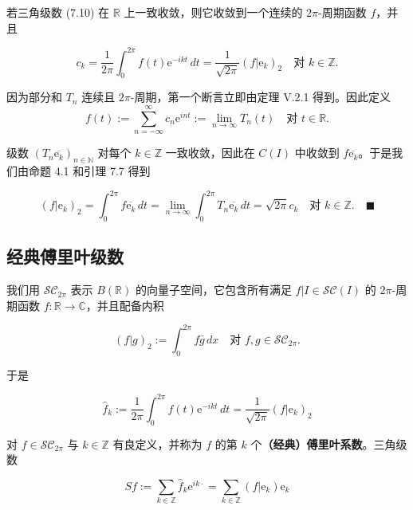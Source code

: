\begin{proposition}

若三角级数 (7.10) 在 $ \mathbb{R} $ 上一致收敛，则它收敛到一个连续的 $ 2\pi $-周期函数 $ f $，并且

\[
c_{k} = \frac{1}{2\pi}\int_{0}^{2\pi} f(t)\mathrm{e}^{-ikt} \, dt = \frac{1}{\sqrt{2\pi}}(f|\mathrm{e}_{k})_{2} \quad \text{对 } k \in \mathbb{Z} .
\]

\proofhead
因为部分和 $ T_{n} $ 连续且 $ 2\pi $-周期，第一个断言立即由定理 V.2.1 得到。因此定义
\[
f(t) := \sum_{n=-\infty}^{\infty} c_{n}\mathrm{e}^{int} := \lim_{n \to \infty} T_{n}(t) \quad \text{对 } t \in \mathbb{R} .
\]

级数 $ (T_{n}\overline{\mathrm{e}_{k}})_{n \in \mathbb{N}} $ 对每个 $ k \in \mathbb{Z} $ 一致收敛，因此在 $ C(I) $ 中收敛到 $ f\overline{\mathrm{e}_{k}} $。于是我们由命题 4.1 和引理 7.7 得到

\[
(f|\mathrm{e}_{k})_{2} = \int_{0}^{2\pi} f\overline{\mathrm{e}_{k}} \, dt = \lim_{n \to \infty}\int_{0}^{2\pi} T_{n}\overline{\mathrm{e}_{k}} \, dt = \sqrt{2\pi}c_{k} \quad \text{对 } k \in \mathbb{Z} .\quad\blacksquare
\]
\end{proposition}

\subsection*{经典傅里叶级数}

我们用 $ \mathcal{SC}_{2\pi} $ 表示 $ B(\mathbb{R}) $ 的向量子空间，它包含所有满足 $ f|I \in \mathcal{SC}(I) $ 的 $ 2\pi $-周期函数 $ f : \mathbb{R} \to \mathbb{C} $，并且配备内积

\[
(f|g)_{2} := \int_{0}^{2\pi} f\bar{g} \, dx \quad \text{对 } f, g \in \mathcal{SC}_{2\pi} .
\]

于是

\begin{equation}
\hat{f}_{k} := \frac{1}{2\pi}\int_{0}^{2\pi} f(t)\mathrm{e}^{-ikt} \, dt = \frac{1}{\sqrt{2\pi}}(f|\mathrm{e}_{k})_{2}\tag{7.11}
\end{equation}

对 $ f \in \mathcal{SC}_{2\pi} $ 与 $ k \in \mathbb{Z} $ 有良定义，并称为 $ f $ 的第 $ k $ 个\textbf{（经典）傅里叶系数}。三角级数

\begin{equation}
Sf := \sum_{k \in \mathbb{Z}} \hat{f}_{k}\mathrm{e}^{ik\cdot} = \sum_{k \in \mathbb{Z}} (f|\mathrm{e}_{k})\mathrm{e}_{k}\tag{7.12}
\end{equation}

